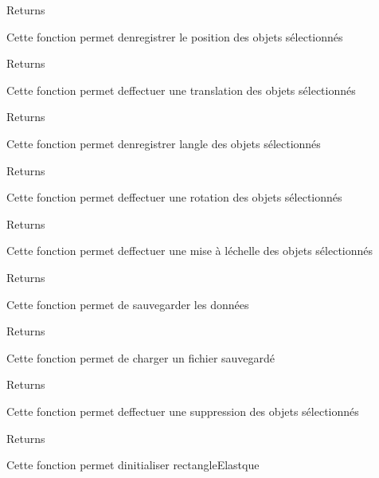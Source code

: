 \begin{DoxyReturn}{Returns}

\end{DoxyReturn}
Cette fonction permet d\textquotesingle{}enregistrer le position des objets sélectionnés

\begin{DoxyReturn}{Returns}

\end{DoxyReturn}
Cette fonction permet d\textquotesingle{}effectuer une translation des objets sélectionnés

\begin{DoxyReturn}{Returns}

\end{DoxyReturn}
Cette fonction permet d\textquotesingle{}enregistrer l\textquotesingle{}angle des objets sélectionnés

\begin{DoxyReturn}{Returns}

\end{DoxyReturn}
Cette fonction permet d\textquotesingle{}effectuer une rotation des objets sélectionnés

\begin{DoxyReturn}{Returns}

\end{DoxyReturn}
Cette fonction permet d\textquotesingle{}effectuer une mise à l\textquotesingle{}échelle des objets sélectionnés

\begin{DoxyReturn}{Returns}

\end{DoxyReturn}
Cette fonction permet de sauvegarder les données

\begin{DoxyReturn}{Returns}

\end{DoxyReturn}
Cette fonction permet de charger un fichier sauvegardé

\begin{DoxyReturn}{Returns}

\end{DoxyReturn}
Cette fonction permet d\textquotesingle{}effectuer une suppression des objets sélectionnés

\begin{DoxyReturn}{Returns}

\end{DoxyReturn}
Cette fonction permet d\textquotesingle{}initialiser rectangle\+Elastque


